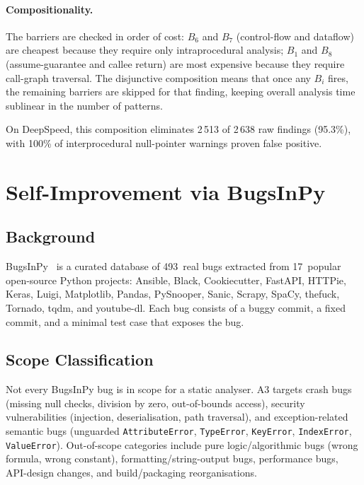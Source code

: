 \documentclass[sigconf,review,anonymous]{acmart}
\begin{document}
\paragraph{Compositionality.}
The barriers are checked in order of cost: $B_6$ and $B_7$ (control-flow and dataflow) are cheapest because they require only intraprocedural analysis; $B_1$ and $B_8$ (assume-guarantee and callee return) are most expensive because they require call-graph traversal.  The disjunctive composition means that once any $B_i$ fires, the remaining barriers are skipped for that finding, keeping overall analysis time sublinear in the number of patterns.

On DeepSpeed, this composition eliminates 2\,513 of 2\,638 raw findings (95.3\%), with 100\% of interprocedural null-pointer warnings proven false positive.

\section{Self-Improvement via BugsInPy}\label{sec:bugsinpy}

\subsection{Background}

BugsInPy~\cite{widyasari2020bugsinpy} is a curated database of 493~real bugs extracted from 17~popular open-source Python projects: Ansible, Black, Cookiecutter, FastAPI, HTTPie, Keras, Luigi, Matplotlib, Pandas, PySnooper, Sanic, Scrapy, SpaCy, thefuck, Tornado, tqdm, and youtube-dl.
Each bug consists of a buggy commit, a fixed commit, and a minimal test case that exposes the bug.

\subsection{Scope Classification}

Not every BugsInPy bug is in scope for a static analyser.
\textsc{A3} targets crash bugs (missing null checks, division by zero, out-of-bounds access), security vulnerabilities (injection, deserialisation, path traversal), and exception-related semantic bugs (unguarded \texttt{AttributeError}, \texttt{TypeError}, \texttt{KeyError}, \texttt{IndexError}, \texttt{ValueError}).
Out-of-scope categories include pure logic/algorithmic bugs (wrong formula, wrong constant), formatting/string-output bugs, performance bugs, API-design changes, and build/packaging reorganisations.
\end{document}
